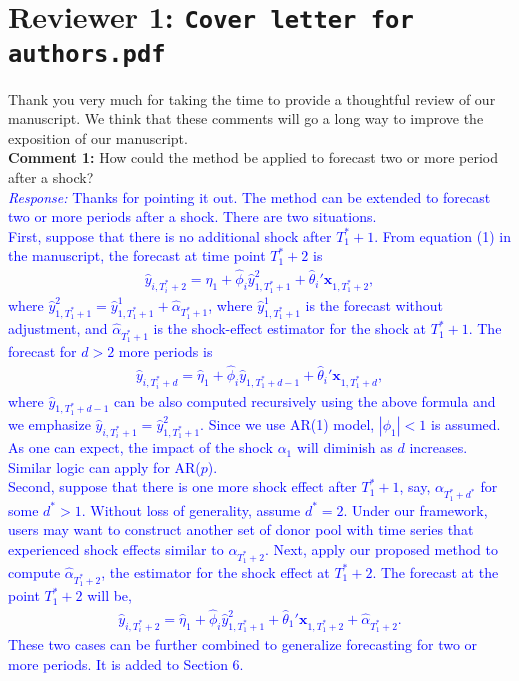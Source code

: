 \documentclass[12pt]{article}
\newcommand{\response}[1]{\noindent \textcolor{blue}{\emph{Response:} #1}}
\begin{document}
\newpage
\section*{Reviewer 1: \texttt{Cover letter for authors.pdf}}

Thank you very much for taking the time to provide a thoughtful review of our manuscript. We think that these comments will go a long way to improve the exposition of our manuscript. \\


{\bf  Comment 1:} How could the method be applied to forecast two or more period after a shock? \\

\response{Thanks for pointing it out. The method can be extended to forecast two or more periods after a shock. There are two situations.  \\

First, suppose that there is no additional shock after $T_1^* + 1$. From equation (1) in the manuscript, the forecast at time point $T_1^*+2$ is
\begin{align*}
 \hat{y}_{i, T_i^* + 2} = \hat{\eta}_1 + \hat{\phi}_i \hat{y}_{1, T_1^*+1}^{2} + \hat{\theta}_i'\mathbf{x}_{1, T_1^*+2}, \tag{*}
\end{align*}
where $\hat{y}_{1, T_1^*+1}^{2}=\hat{y}_{1, T_1^*+1}^{1} + \hat{\alpha}_{T_1^* + 1}$, where $\hat{y}_{1, T_1^*+1}^{1}$ is the forecast without adjustment, and  $\hat{\alpha}_{T_1^* + 1}$ is the shock-effect estimator for the shock at $T_1^*+1$. The forecast for $d>2$ more periods is
\begin{align*}
 \hat{y}_{i, T_i^* + d} = \hat{\eta}_1 + \hat{\phi}_i \hat{y}_{1, T_1^*+d-1}+ \hat{\theta}_i'\mathbf{x}_{1, T_1^*+d},
\end{align*}
where $\hat{y}_{1, T_1^*+d-1}$ can be also computed recursively using the above formula and we  emphasize  $ \hat{y}_{i, T_i^* + 1}=\hat{y}_{1, T_1^*+1}^{2}$. Since we use AR(1) model, $|\phi_1 |< 1$ is assumed.  As one can expect, the impact of the shock  $\alpha_1$ will diminish as $d$ increases. Similar logic can apply for AR($p$). \\

Second, suppose that  there is one more shock effect after $T_1^*+1$, say, $\alpha_{T_1^* + d^*}$ for some $d^* > 1$. Without loss of generality, assume $d^* = 2$. Under our framework, users may want to construct another set of donor pool with time series that experienced shock effects similar to $\alpha_{T_1^* + 2}$. Next,  apply our proposed method to compute $\hat{\alpha}_{T_1^* + 2}$, the estimator for the shock effect at $T_1^* +2$. The forecast at the point $T_1^* + 2$ will be,  
\begin{align*}
 \hat{y}_{i, T_i^* + 2} = \hat{\eta}_1 + \hat{\phi}_i \hat{y}_{1, T_1^*+1}^{2} + \hat{\theta}_1'\mathbf{x}_{1, T_1^*+2} + \hat{\alpha}_{T_1^* + 2}.
\end{align*}
These two cases can be further combined to generalize forecasting for two or more periods. It is added to Section 6.\\
}
\end{document}
